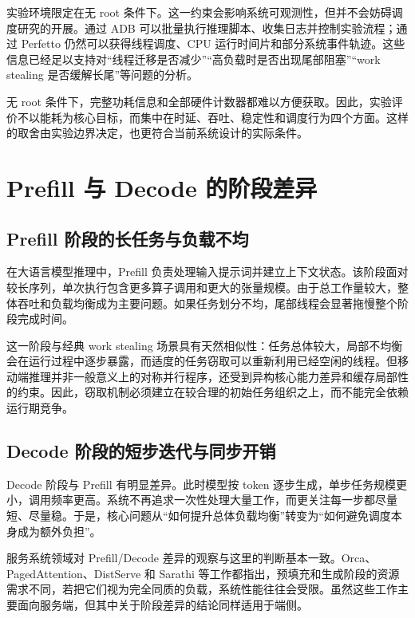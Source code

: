 实验环境限定在无 root 条件下。这一约束会影响系统可观测性，但并不会妨碍调度研究的开展。通过 ADB 可以批量执行推理脚本、收集日志并控制实验流程；通过 Perfetto 仍然可以获得线程调度、CPU 运行时间片和部分系统事件轨迹。这些信息已经足以支持对“线程迁移是否减少”“高负载时是否出现尾部阻塞”“work stealing 是否缓解长尾”等问题的分析。

无 root 条件下，完整功耗信息和全部硬件计数器都难以方便获取。因此，实验评价不以能耗为核心目标，而集中在时延、吞吐、稳定性和调度行为四个方面。这样的取舍由实验边界决定，也更符合当前系统设计的实际条件。

\section{Prefill 与 Decode 的阶段差异}

\subsection{Prefill 阶段的长任务与负载不均}

在大语言模型推理中，Prefill 负责处理输入提示词并建立上下文状态。该阶段面对较长序列，单次执行包含更多算子调用和更大的张量规模。由于总工作量较大，整体吞吐和负载均衡成为主要问题。如果任务划分不均，尾部线程会显著拖慢整个阶段完成时间。

这一阶段与经典 work stealing 场景具有天然相似性：任务总体较大，局部不均衡会在运行过程中逐步暴露，而适度的任务窃取可以重新利用已经空闲的线程\cite{blumofe1999workstealing,acar2000locality}。但移动端推理并非一般意义上的对称并行程序，还受到异构核心能力差异和缓存局部性的约束。因此，窃取机制必须建立在较合理的初始任务组织之上，而不能完全依赖运行期竞争。

\subsection{Decode 阶段的短步迭代与同步开销}

Decode 阶段与 Prefill 有明显差异。此时模型按 token 逐步生成，单步任务规模更小，调用频率更高。系统不再追求一次性处理大量工作，而更关注每一步都尽量短、尽量稳。于是，核心问题从“如何提升总体负载均衡”转变为“如何避免调度本身成为额外负担”。

服务系统领域对 Prefill/Decode 差异的观察与这里的判断基本一致。Orca、PagedAttention、DistServe 和 Sarathi 等工作都指出，预填充和生成阶段的资源需求不同，若把它们视为完全同质的负载，系统性能往往会受限\cite{yu2022orca,kwon2023pagedattention,zhong2024distserve,agrawal2023sarathi}。虽然这些工作主要面向服务端，但其中关于阶段差异的结论同样适用于端侧。

